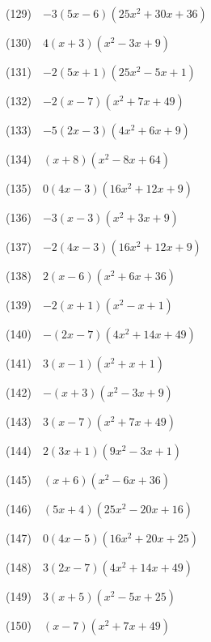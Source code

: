 \documentclass[a4j,twocolumn,10pt,fleqn]{jarticle}
\begin{document}
(129)~~$-3\left(5 x - 6\right) \left(25 x^{2} + 30 x + 36\right)$

(130)~~$4\left(x + 3\right) \left(x^{2} - 3 x + 9\right)$

(131)~~$-2\left(5 x + 1\right) \left(25 x^{2} - 5 x + 1\right)$

(132)~~$-2\left(x - 7\right) \left(x^{2} + 7 x + 49\right)$

(133)~~$-5\left(2 x - 3\right) \left(4 x^{2} + 6 x + 9\right)$

(134)~~$\left(x + 8\right) \left(x^{2} - 8 x + 64\right)$

(135)~~$0\left(4 x - 3\right) \left(16 x^{2} + 12 x + 9\right)$

(136)~~$-3\left(x - 3\right) \left(x^{2} + 3 x + 9\right)$

(137)~~$-2\left(4 x - 3\right) \left(16 x^{2} + 12 x + 9\right)$

(138)~~$2\left(x - 6\right) \left(x^{2} + 6 x + 36\right)$

(139)~~$-2\left(x + 1\right) \left(x^{2} - x + 1\right)$

(140)~~$-\left(2 x - 7\right) \left(4 x^{2} + 14 x + 49\right)$

(141)~~$3\left(x - 1\right) \left(x^{2} + x + 1\right)$

(142)~~$-\left(x + 3\right) \left(x^{2} - 3 x + 9\right)$

(143)~~$3\left(x - 7\right) \left(x^{2} + 7 x + 49\right)$

(144)~~$2\left(3 x + 1\right) \left(9 x^{2} - 3 x + 1\right)$

(145)~~$\left(x + 6\right) \left(x^{2} - 6 x + 36\right)$

(146)~~$\left(5 x + 4\right) \left(25 x^{2} - 20 x + 16\right)$

(147)~~$0\left(4 x - 5\right) \left(16 x^{2} + 20 x + 25\right)$

(148)~~$3\left(2 x - 7\right) \left(4 x^{2} + 14 x + 49\right)$

(149)~~$3\left(x + 5\right) \left(x^{2} - 5 x + 25\right)$

(150)~~$\left(x - 7\right) \left(x^{2} + 7 x + 49\right)$
\end{document}
